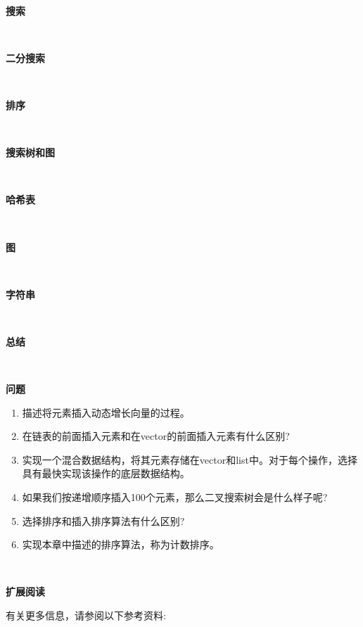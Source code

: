 \noindent\textbf{}\ \par
\textbf{搜索} \ \par

\noindent\textbf{}\ \par
\textbf{二分搜索} \ \par

\noindent\textbf{}\ \par
\textbf{排序} \ \par

\noindent\textbf{}\ \par
\textbf{搜索树和图} \ \par

\noindent\textbf{}\ \par
\textbf{哈希表} \ \par

\noindent\textbf{}\ \par
\textbf{图} \ \par

\noindent\textbf{}\ \par
\textbf{字符串} \ \par

\noindent\textbf{}\ \par
\textbf{总结} \ \par

\noindent\textbf{}\ \par
\textbf{问题} \ \par
\begin{enumerate}
	\item 描述将元素插入动态增长向量的过程。
	\item 在链表的前面插入元素和在vector的前面插入元素有什么区别?
	\item 实现一个混合数据结构，将其元素存储在vector和list中。对于每个操作，选择具有最快实现该操作的底层数据结构。
	\item 如果我们按递增顺序插入100个元素，那么二叉搜索树会是什么样子呢?
	\item 选择排序和插入排序算法有什么区别?
	\item 实现本章中描述的排序算法，称为计数排序。
\end{enumerate}

\noindent\textbf{}\ \par
\textbf{扩展阅读} \ \par
有关更多信息，请参阅以下参考资料: \par

